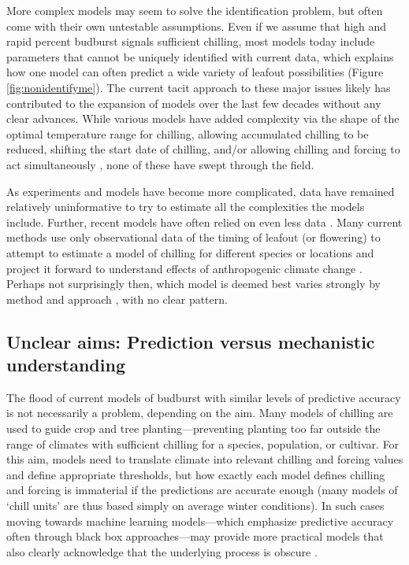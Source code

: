 \documentclass[11pt]{article}
\begin{document}
More complex models may seem to solve the identification problem, but often come with their own untestable assumptions. Even if we assume that high and rapid percent budburst signals sufficient chilling, most models today include parameters that cannot be uniquely identified with current data, which explains how one model can often predict a wide variety of leafout possibilities (Figure \ref{fig:nonidentifyme}). The current tacit approach to these major issues likely has contributed to the expansion of models over the last few decades without any clear advances. While various models have added complexity via the shape of the optimal temperature range for chilling, allowing accumulated chilling to be reduced, shifting the start date of chilling, and/or allowing chilling and forcing to act simultaneously \citep{lued2009,gusewell2017,hanninen1990modelling,Kramer1994}, none of these have swept through the field. 

As experiments and models have become more complicated, data have remained relatively uninformative to try to estimate all the complexities the models include. Further, recent models have often relied on even less data \citep{hanninen2019experiments}. Many current methods use only observational data of the timing of leafout (or flowering) to attempt to estimate a model of chilling for different species or locations and project it forward to understand effects of anthropogenic climate change \citep{lued2011,luedeling2012chilling,gao2024}. Perhaps not surprisingly then, which model is deemed best varies strongly by method and approach \citep{Caffarra:2011qf,basler2016evaluating,hufkens2018integrated}, with no clear pattern. 

\subsection*{Unclear aims: Prediction versus mechanistic understanding}

The flood of current models of budburst with similar levels of predictive accuracy is not necessarily a problem, depending on the aim. Many models of chilling are used to guide crop and tree planting---preventing planting too far outside the range of climates with sufficient chilling for a species, population, or cultivar. For this aim, models need to translate climate into relevant chilling and forcing values and define appropriate thresholds, but how exactly each model defines chilling and forcing is immaterial if the predictions are accurate enough (many models of `chill units' are thus based simply on average winter conditions). In such cases moving towards machine learning models---which emphasize predictive accuracy often through black box approaches---may provide more practical models that also clearly acknowledge that the underlying process is obscure \citep{khodadadzadeh}. 
\end{document}
